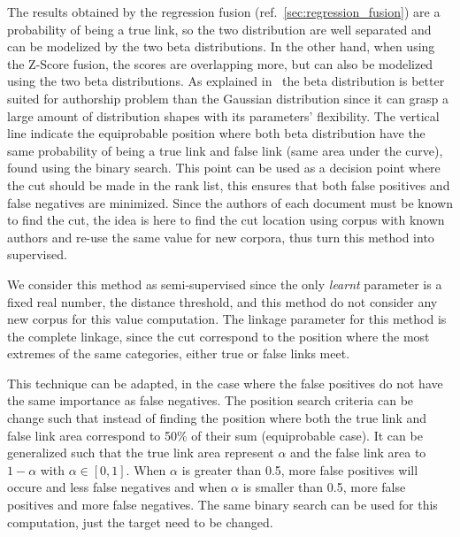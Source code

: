 The results obtained by the regression fusion (ref.~\ref{sec:regression_fusion}) are a probability of being a true link, so the two distribution are well separated and can be modelized by the two beta distributions.
In the other hand, when using the Z-Score fusion, the scores are overlapping more, but can also be modelized using the two beta distributions.
As explained in~\cite{savoy_probability} the beta distribution is better suited for authorship problem than the Gaussian distribution since it can grasp a large amount of distribution shapes with its parameters' flexibility.
The vertical line indicate the equiprobable position where both beta distribution have the same probability of being a true link and false link (same area under the curve), found using the binary search.
This point can be used as a decision point where the cut should be made in the rank list, this ensures that both false positives and false negatives are minimized.
Since the authors of each document must be known to find the cut, the idea is here to find the cut location using corpus with known authors and re-use the same value for new corpora, thus turn this method into supervised.

We consider this method as semi-supervised since the only \textit{learnt} parameter is a fixed real number, the distance threshold, and this method do not consider any new corpus for this value computation.
The linkage parameter for this method is the complete linkage, since the cut correspond to the position where the most extremes of the same categories, either true or false links meet.

This technique can be adapted, in the case where the false positives do not have the same importance as false negatives.
The position search criteria can be change such that instead of finding the position where both the true link and false link area correspond to 50\% of their sum (equiprobable case).
It can be generalized such that the true link area represent $\alpha$ and the false link area to $1-\alpha$ with $\alpha \in \left[0,1\right]$.
When $\alpha$ is greater than 0.5, more false positives will occure and less false negatives and when $\alpha$ is smaller than 0.5, more false positives and more false negatives.
The same binary search can be used for this computation, just the target need to be changed.

